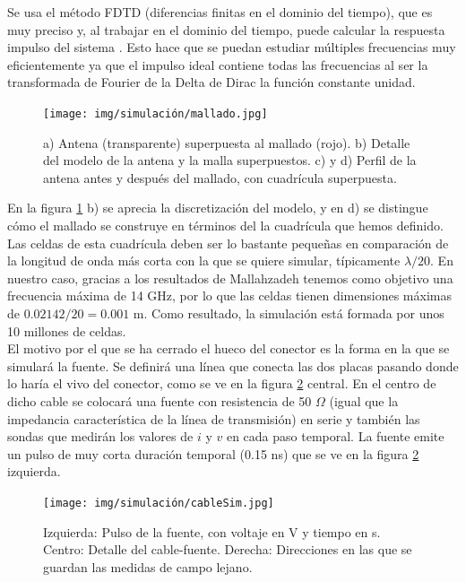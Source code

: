 \documentclass[11pt,a4paper,twoside,pdf]{article}
\numberwithin{equation}{section}
\begin{document}
Se usa el método FDTD (diferencias finitas en el dominio del tiempo), que es muy preciso y, al trabajar en el dominio del tiempo, puede calcular la respuesta impulso del sistema \cite{FDTD}. Esto hace que se puedan estudiar múltiples frecuencias muy eficientemente ya que el impulso ideal contiene todas las frecuencias al ser la transformada de Fourier de la Delta de Dirac la función constante unidad.\\
\begin{figure}[!h]
    \centering
    \texttt{[image: img/simulación/mallado.jpg]}
    \vspace{-0.5cm}
    \caption{a) Antena (transparente) superpuesta al mallado (rojo). b) Detalle del modelo de la antena y la malla superpuestos. c) y d) Perfil de la antena antes y después del mallado, con cuadrícula superpuesta.}
    \label{fig:mallado}
\end{figure}

En la figura \ref{fig:mallado} b) se aprecia la discretización del modelo, y en d) se distingue cómo el mallado se construye en términos del la cuadrícula que hemos definido. Las celdas de esta cuadrícula deben ser lo bastante pequeñas en comparación de la longitud de onda más corta con la que se quiere simular, típicamente $\lambda/20$. En nuestro caso, gracias a los resultados de Mallahzadeh \cite{tem_horn} tenemos como objetivo una frecuencia máxima de 14 GHz, por lo que las celdas tienen dimensiones máximas de $0.02142/20 = 0.001$ m. Como resultado, la simulación está formada por unos 10 millones de celdas.\\

El motivo por el que se ha cerrado el hueco del conector es la forma en la que se simulará la fuente. Se definirá una línea que conecta las dos placas pasando donde lo haría el vivo del conector, como se ve en la figura \ref{fig:simCable} central. En el centro de dicho cable se colocará una fuente con resistencia de 50 $\Omega$ (igual que la impedancia característica de la línea de transmisión) en serie y también las sondas que medirán los valores de $i$ y $v$ en cada paso temporal. La fuente emite un pulso de muy corta duración temporal (0.15 ns) que se ve en la figura \ref{fig:simCable} izquierda.
\begin{figure}[!h]
    \centering
    \texttt{[image: img/simulación/cableSim.jpg]}
    \vspace{-0.5cm}
    \caption{Izquierda: Pulso de la fuente, con voltaje en V y tiempo en s. Centro: Detalle del cable-fuente. Derecha: Direcciones en las que se guardan las medidas de campo lejano.}
    \label{fig:simCable}
\end{figure}
\end{document}
